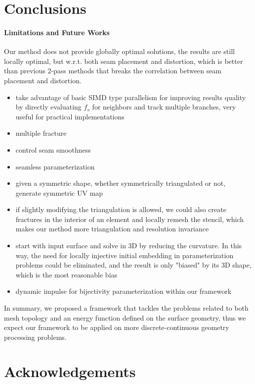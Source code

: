 
\section{Conclusions}
\label{sec:conclusion}

\paragraph{Limitations and Future Works}
Our method does not provide globally optimal solutions, the results are still locally optimal, but w.r.t. both seam placement and distortion, which is better than previous 2-pass methods that breaks the correlation between seam placement and distortion.

\begin{itemize}
\item take advantage of basic SIMD type parallelism for improving results quality by directly evaluating $f_v$ for neighbors and track multiple branches, very useful for practical implementations
\item multiple fracture
\item control seam smoothness
\item seamless parameterization
\item given a symmetric shape, whether symmetrically triangulated or not, generate symmetric UV map
\item if slightly modifying the triangulation is allowed, we could also create fractures in the interior of an element and locally remesh the stencil, which makes our method more triangulation and resolution invariance
\item start with input surface and solve in 3D by reducing the curvature. In this way, the need for locally injective initial embedding in parameterization problems could be eliminated, and the result is only "biased" by its 3D shape, which is the most reasonable bias
\item dynamic impulse for bijectivity parameterization within our framework
\end{itemize}

In summary, we proposed a framework that tackles the problems related to both mesh topology and an energy function defined on the surface geometry, thus we expect our framework to be applied on more discrete-continuous geometry processing problems.

\section*{Acknowledgements} 